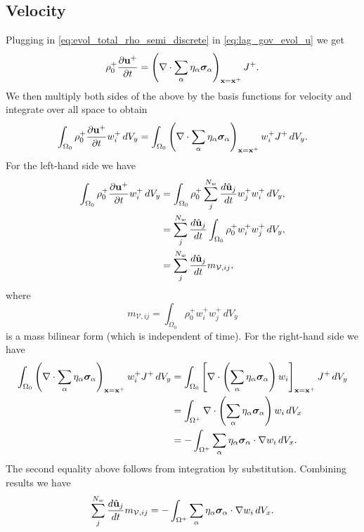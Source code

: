\documentclass[11pt]{report}
\begin{document}
\subsection{Velocity}
Plugging in \cref{eq:evol_total_rho_semi_discrete} in \cref{eq:lag_gov_evol_u} we get
\begin{equation*}
    \rho^+_0 \frac{\partial \mathbf{u}^+}{\partial t} = \left ( \nabla \cdot \sum_\alpha \eta_\alpha \bm \sigma_\alpha \right )_{\mathbf{x} = \mathbf{x}^+} J^+.
\end{equation*}
We then multiply both sides of the above by the basis functions for velocity and integrate over all space to obtain
\begin{equation*}
    \int_{\Omega_0} \rho^+_0 \frac{\partial \mathbf{u}^+}{\partial t} w^+_i \, dV_y = \int_{\Omega_0} \left ( \nabla \cdot \sum_\alpha \eta_\alpha \bm \sigma_\alpha \right )_{\mathbf{x} = \mathbf{x}^+} w^+_i J^+ \, dV_y.
\end{equation*}
For the left-hand side we have
\begin{align*}
    \int_{\Omega_0} \rho^+_0 \frac{\partial \mathbf{u}^+}{\partial t} w^+_i \, dV_y &= \int_{\Omega_0} \rho^+_0 \sum_j^{N_w} \frac{d \hat{\mathbf{u}}_j}{dt} w^+_j w^+_i \, dV_y, \nonumber \\
    &= \sum_j^{N_w} \frac{d \hat{\mathbf{u}}_j}{dt} \int_{\Omega_0} \rho^+_0 w^+_i w^+_j \, dV_y, \nonumber \\
    &= \sum_j^{N_w} \frac{d \hat{\mathbf{u}}_j}{dt} m_{\mathcal{V},ij},
\end{align*}
where
\begin{equation}
    m_{\mathcal{V},ij} = \int_{\Omega_0} \rho^+_0 w^+_i w^+_j \, dV_y
\end{equation}
is a mass bilinear form (which is independent of time). For the right-hand side we have
\begin{align*}
    \int_{\Omega_0} \left ( \nabla \cdot \sum_\alpha \eta_\alpha \bm \sigma_\alpha \right )_{\mathbf{x} = \mathbf{x}^+} w^+_i J^+ \, dV_y & = \int_{\Omega_0} \left[ \nabla \cdot \left( \sum_\alpha \eta_\alpha \bm \sigma_\alpha \right) w_i \right]_{\mathbf{x} = \mathbf{x}^+} J^+ \, dV_y \nonumber \\
    & = \int_{\Omega^+} \nabla \cdot \left( \sum_\alpha \eta_\alpha \bm \sigma_\alpha \right) w_i \, dV_x \nonumber \\
    & = -\int_{\Omega^+} \sum_\alpha \eta_\alpha \bm \sigma_\alpha \cdot \nabla w_i \, dV_x.
\end{align*}
The second equality above follows from integration by substitution. Combining results we have
\begin{equation}
    \label{eq:evol_u_semi_discrete}
    \sum_j^{N_w} \frac{d \hat{\mathbf{u}}_j}{d t} m_{\mathcal{V},ij} = -\int_{\Omega^+} \sum_\alpha \eta_\alpha \bm \sigma_\alpha \cdot \nabla w_i \, dV_x.
\end{equation}
\end{document}
